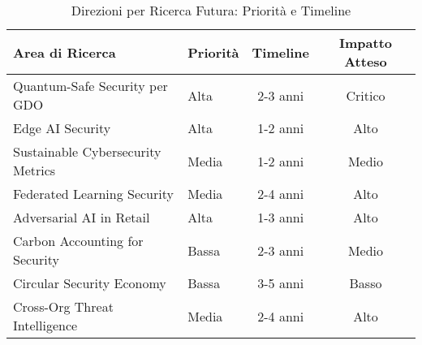 \documentclass[12pt,a4paper]{article}
\begin{document}

\begin{table}[htbp]
\centering
\caption{Direzioni per Ricerca Futura: Priorità e Timeline}
\label{tab:future_research_directions}
\begin{tabular}{@{}llcc@{}}
\toprule
\textbf{Area di Ricerca} & \textbf{Priorità} & \textbf{Timeline} & \textbf{Impatto Atteso} \\
\midrule
Quantum-Safe Security per GDO & Alta & 2-3 anni & Critico \\
\addlinespace
Edge AI Security & Alta & 1-2 anni & Alto \\
\addlinespace
Sustainable Cybersecurity Metrics & Media & 1-2 anni & Medio \\
\addlinespace
Federated Learning Security & Media & 2-4 anni & Alto \\
\addlinespace
Adversarial AI in Retail & Alta & 1-3 anni & Alto \\
\addlinespace
Carbon Accounting for Security & Bassa & 2-3 anni & Medio \\
\addlinespace
Circular Security Economy & Bassa & 3-5 anni & Basso \\
\addlinespace
Cross-Org Threat Intelligence & Media & 2-4 anni & Alto \\
\bottomrule
\end{tabular}
\end{table}
\end{document}

